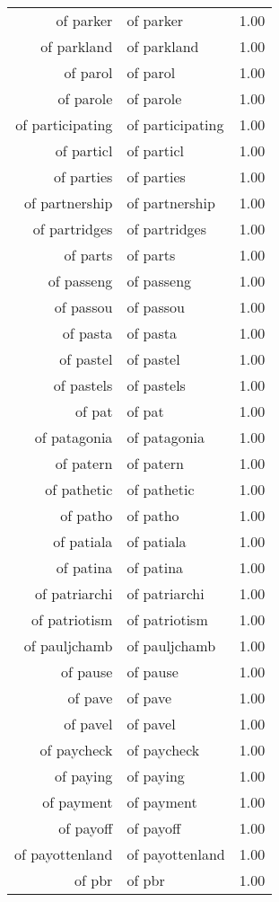 \begin{table}[ht]
\begin{tabular}{rlr}
  of parker & of parker & 1.00 \\ 
  of parkland & of parkland & 1.00 \\ 
  of parol & of parol & 1.00 \\ 
  of parole & of parole & 1.00 \\ 
  of participating & of participating & 1.00 \\ 
  of particl & of particl & 1.00 \\ 
  of parties & of parties & 1.00 \\ 
  of partnership & of partnership & 1.00 \\ 
  of partridges & of partridges & 1.00 \\ 
  of parts & of parts & 1.00 \\ 
  of passeng & of passeng & 1.00 \\ 
  of passou & of passou & 1.00 \\ 
  of pasta & of pasta & 1.00 \\ 
  of pastel & of pastel & 1.00 \\ 
  of pastels & of pastels & 1.00 \\ 
  of pat & of pat & 1.00 \\ 
  of patagonia & of patagonia & 1.00 \\ 
  of patern & of patern & 1.00 \\ 
  of pathetic & of pathetic & 1.00 \\ 
  of patho & of patho & 1.00 \\ 
  of patiala & of patiala & 1.00 \\ 
  of patina & of patina & 1.00 \\ 
  of patriarchi & of patriarchi & 1.00 \\ 
  of patriotism & of patriotism & 1.00 \\ 
  of pauljchamb & of pauljchamb & 1.00 \\ 
  of pause & of pause & 1.00 \\ 
  of pave & of pave & 1.00 \\ 
  of pavel & of pavel & 1.00 \\ 
  of paycheck & of paycheck & 1.00 \\ 
  of paying & of paying & 1.00 \\ 
  of payment & of payment & 1.00 \\ 
  of payoff & of payoff & 1.00 \\ 
  of payottenland & of payottenland & 1.00 \\ 
  of pbr & of pbr & 1.00 \\ 

\end{tabular}
\end{table}
